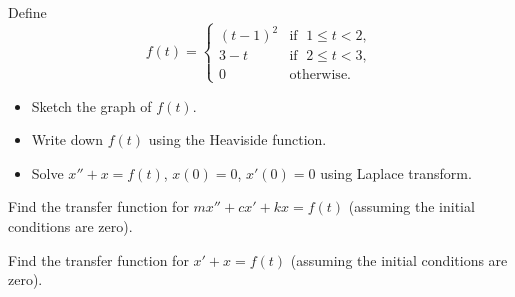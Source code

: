 \documentclass{ximera}
\begin{document}
\begin{exercise}
    Define
    \begin{equation*}
        f(t) =
        \begin{cases}
            {(t-1)}^2 & \text{if } \; 1 \leq t < 2, \\
            3-t & \text{if } \; 2 \leq t < 3, \\
            0 & \text{otherwise} .
        \end{cases}
    \end{equation*}
    \begin{itemize}
        \item Sketch the graph of $f(t)$.
        \item Write down $f(t)$ using the Heaviside function.
        \item Solve $x''+x=f(t)$, $x(0)=0$, $x'(0) = 0$ using Laplace transform.
    \end{itemize}
\end{exercise}

\begin{exercise}
    Find the transfer function for $m x'' + c x' + kx = f(t)$ (assuming the initial conditions are zero).
\end{exercise}

\begin{exercise}%
    Find the transfer function for $x' + x = f(t)$ (assuming the initial conditions are zero).
\end{exercise}

\end{document}
